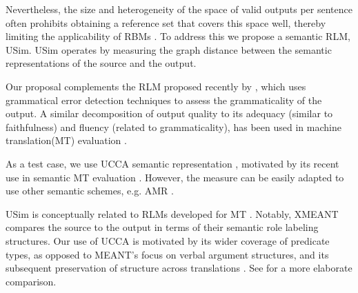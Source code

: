 \documentclass[a4paper, 11pt]{article}
\newcommand{\lc}[1]{\footnote{\color{blue}LC: #1}}
\begin{document}
Nevertheless, the size and heterogeneity of the space of valid outputs per sentence often prohibits
obtaining a reference set that covers this space well, thereby limiting the applicability
of RBMs \cite{bryant2015far}.
To address this we propose a semantic RLM, {\sc USim}.
{\sc USim} operates by measuring the graph distance between the semantic
representations of the source and the output.

Our proposal complements the RLM proposed recently by 
, which uses grammatical error detection techniques to assess the grammaticality of the output.
A similar decomposition of output quality to its adequacy (similar to faithfulness)
and fluency (related to grammaticality), has been used in machine translation(MT)
evaluation \cite[e.g.,][]{banchs2015adequacy}.

As a test case, we use UCCA semantic representation \cite{abend2013universal},
motivated by its recent use in semantic MT evaluation \cite{birch2016hume}.
However, the measure can be easily adapted to use other semantic schemes, e.g. AMR \cite{banarescu-EtAl:2013:LAW7-ID}.

{\sc USim} is conceptually related to RLMs developed
for MT
\cite{reeder2006measuring,albrecht2007regression,specia2009estimating,specia2010machine}.
Notably, XMEANT \cite{lo2014xmeant} compares the source to the output
in terms of their semantic role labeling structures.
Our use of UCCA is motivated by its wider coverage of predicate types, as opposed to 
MEANT's focus on verbal argument structures, and its subsequent preservation
of structure across translations \cite{sulem2015conceptual}.
See \cite{birch2016hume} for a more elaborate comparison. 



\end{document}
